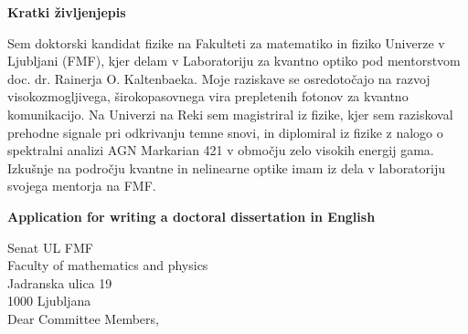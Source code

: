 \documentclass{article}
\begin{document}
\vspace{1cm}

\begin{center}
	\textbf{Kratki življenjepis}
\end{center}
Sem doktorski kandidat fizike na Fakulteti za matematiko in fiziko Univerze v Ljubljani (FMF),
kjer delam v Laboratoriju za kvantno optiko pod mentorstvom doc. dr. Rainerja O. Kaltenbaeka.
Moje raziskave se osredotočajo na razvoj visokozmogljivega, širokopasovnega vira prepletenih fotonov za kvantno komunikacijo.
Na Univerzi na Reki sem magistriral iz fizike, kjer sem raziskoval prehodne signale pri odkrivanju temne snovi,
in diplomiral iz fizike z nalogo o spektralni analizi AGN Markarian 421 v območju zelo visokih energij gama.
Izkušnje na področju kvantne in nelinearne optike imam iz dela v laboratoriju svojega mentorja na FMF.




\clearpage
\pagestyle{plain}
\setcounter{page}{4}
\begin{center}
	\textbf{Application for writing a doctoral dissertation in English}\\
\end{center}

\noindent Senat UL FMF\\
Faculty of mathematics and physics\\
Jadranska ulica 19\\
1000 Ljubljana\\

\vspace{1cm} %
Dear Committee Members,
\vspace{1cm}
\end{document}
